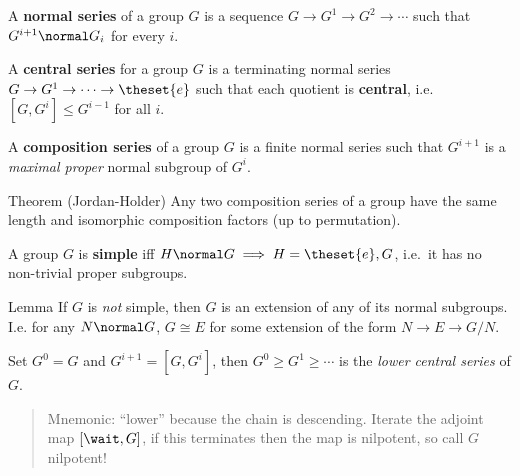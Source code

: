 \begin{definition}

A \textbf{normal series} of a group \(G\) is a sequence
\(G \to G^1 \to G^2 \to \cdots\) such that \(G^{i+1} \normal G_i\) for
every \(i\).

\end{definition}

\begin{definition}

A \textbf{central series} for a group \(G\) is a terminating normal
series \(G \to G^1 \to \cdots \to \theset{e}\) such that each quotient
is \textbf{central}, i.e.~\([G, G^i] \leq G^{i-1}\) for all \(i\).

\end{definition}

\begin{definition}

A \textbf{composition series} of a group \(G\) is a finite normal series
such that \(G^{i+1}\) is a \emph{maximal proper} normal subgroup of
\(G^i\).

\end{definition}

Theorem (Jordan-Holder) Any two composition series of a group have the
same length and isomorphic composition factors (up to permutation).

\begin{definition}

A group \(G\) is \textbf{simple} iff
\(H\normal G \implies H = \theset{e}, G\), i.e.~it has no non-trivial
proper subgroups.

\end{definition}

Lemma If \(G\) is \emph{not} simple, then \(G\) is an extension of any
of its normal subgroups. I.e. for any \(N\normal G\), \(G \cong E\) for
some extension of the form \(N\to E\to G/N\).

\begin{definition}

Set \(G^0 = G\) and \(G^{i+1} = [G, G^i]\), then
\(G^0 \geq G^1 \geq \cdots\) is the \emph{lower central series} of
\(G\).

\end{definition}

\begin{quote}
Mnemonic: ``lower'' because the chain is descending. Iterate the adjoint
map \([\wait, G]\), if this terminates then the map is nilpotent, so
call \(G\) nilpotent!
\end{quote}

